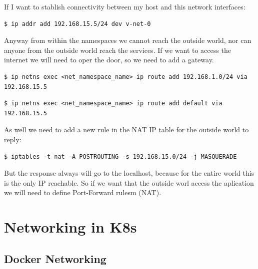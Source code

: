 \documentclass{article}
\newenvironment{codetemplate}[1][]{%
  \mybasecolorbox[#1]
  \itshape
}{%
  \endmybasecolorbox
}
\begin{document}
If I want to stablish connectivity between my host and this network interfaces:
\begin{codetemplate}{}
\begin{verbatim}
$ ip addr add 192.168.15.5/24 dev v-net-0
\end{verbatim}
\end{codetemplate}

Anyway from within the namespaces we cannot reach the outside world, nor can anyone from the outside world reach the services. If we want to access the internet we will need to oper the door, so we need to add a gateway.
\begin{codetemplate}{}
\begin{verbatim}
$ ip netns exec <net_namespace_name> ip route add 192.168.1.0/24 via 192.168.15.5
\end{verbatim}
\end{codetemplate}

\begin{codetemplate}{}
\begin{verbatim}
$ ip netns exec <net_namespace_name> ip route add default via 192.168.15.5
\end{verbatim}
\end{codetemplate}

As well we need to add a new rule in the NAT IP table for the outside world to reply:
\begin{codetemplate}{}
\begin{verbatim}
$ iptables -t nat -A POSTROUTING -s 192.168.15.0/24 -j MASQUERADE
\end{verbatim}
\end{codetemplate}

But the response always will go to the localhost, because for the entire world this is the only IP reachable. So if we want that the outside worl access the aplication we will need to define Port-Forward rulesm (NAT).
\newpage
\section{Networking in K8s}

\subsection{Docker Networking}
\end{document}
